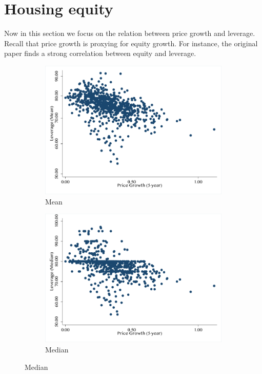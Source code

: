\documentclass[11pt]{article}
\begin{document}
\section{Housing equity}
Now in this section we focus on the relation between price growth and leverage. Recall that price growth is proxying for equity growth. For instance, the original paper finds a strong correlation between equity and leverage. 
\begin{figure}[htb]
    \centering
    \caption{Leverage and Price Growth}
    \label{hw2:fig2}
    \begin{subfigure}[b]{0.47\textwidth}
            \includegraphics[width=\textwidth]{Figures/leverage_mean.pdf}
            \caption{Mean}
        \end{subfigure}
        \begin{subfigure}[b]{0.47\textwidth}
            \includegraphics[width=\textwidth]{Figures/leverage_median.pdf}
            \caption{Median}
        \end{subfigure}
\end{figure}
\end{document}
